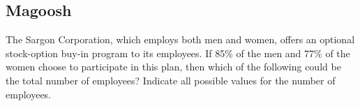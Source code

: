 \documentclass[answers, 11pt]{exam}
\begin{document}
\begin{questions}

\section{Magoosh}
\question
The Sargon Corporation, which employs both men and women, offers an optional stock-option buy-in program to its employees. If 85\% of the men and 77\% of the women choose to participate in this plan, then which of the following could be the total number of employees? Indicate all possible values for the number of employees.
\begin{choices}
\end{choices}


\end{questions}
\end{document}
